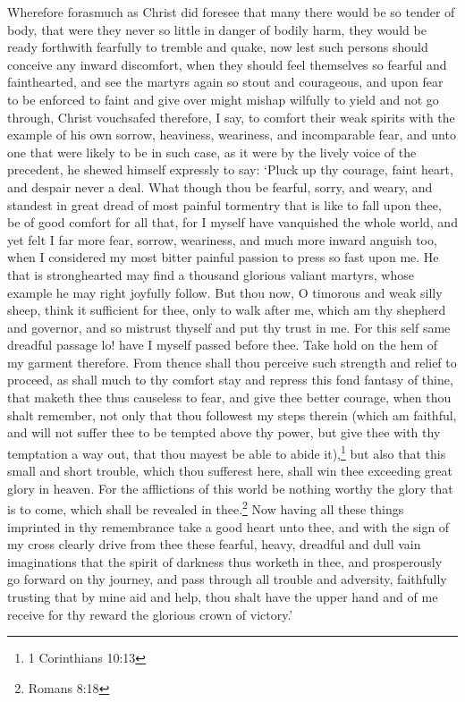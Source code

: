 \documentclass[a5paper]{scrbook}
\begin{document}
	Wherefore forasmuch as Christ did foresee that many there would be so tender of body, that were they never so little in danger of bodily harm, they would be ready forthwith fearfully to tremble and quake, now lest such persons should conceive any inward discomfort, when they should feel themselves so fearful and fainthearted, and see the martyrs again so stout and courageous, and upon fear to be enforced to faint and give over might mishap wilfully to yield and not go through, Christ vouchsafed therefore, I say, to comfort their weak spirits with the example of his own sorrow, heaviness, weariness, and incomparable fear, and unto one that were likely to be in such case, as it were by the lively voice of the precedent, he shewed himself expressly to say: ‘Pluck up thy courage, faint heart, and despair never a deal. What though thou be fearful, sorry, and weary, and standest in great dread of most painful tormentry that is like to fall upon thee, be of good comfort for all that, for I myself have vanquished the whole world, and yet felt I far more fear, sorrow, weariness, and much more inward anguish too, when I considered my most bitter painful passion to press so fast upon me. He that is stronghearted may find a thousand glorious valiant martyrs, whose example he may right joyfully follow. But thou now, O timorous and weak silly sheep, think it sufficient for thee, only to walk after me, which am thy shepherd and governor, and so mistrust thyself and put thy trust in me. For this self same dreadful passage lo! have I myself passed before thee. Take hold on the hem of my garment therefore. From thence shall thou perceive such strength and relief to proceed, as shall much to thy comfort stay and repress this fond fantasy of thine, that maketh thee thus causeless to fear, and give thee better courage, when thou shalt remember, not only that thou followest my steps therein (which am faithful, and will not suffer thee to be tempted above thy power, but give thee with thy temptation a way out, that thou mayest be able to abide it),\footnote{1 Corinthians 10:13} but also that this small and short trouble, which thou sufferest here, shall win thee exceeding great glory in heaven. For the afflictions of this world be nothing worthy the glory that is to come, which shall be revealed in thee.\footnote{Romans 8:18} Now having all these things imprinted in thy remembrance take a good heart unto thee, and with the sign of my cross clearly drive from thee these fearful, heavy, dreadful and dull vain imaginations that the spirit of darkness thus worketh in thee, and prosperously go forward on thy journey, and pass through all trouble and adversity, faithfully trusting that by mine aid and help, thou shalt have the upper hand and of me receive for thy reward the glorious crown of victory.’
	
\end{document}
